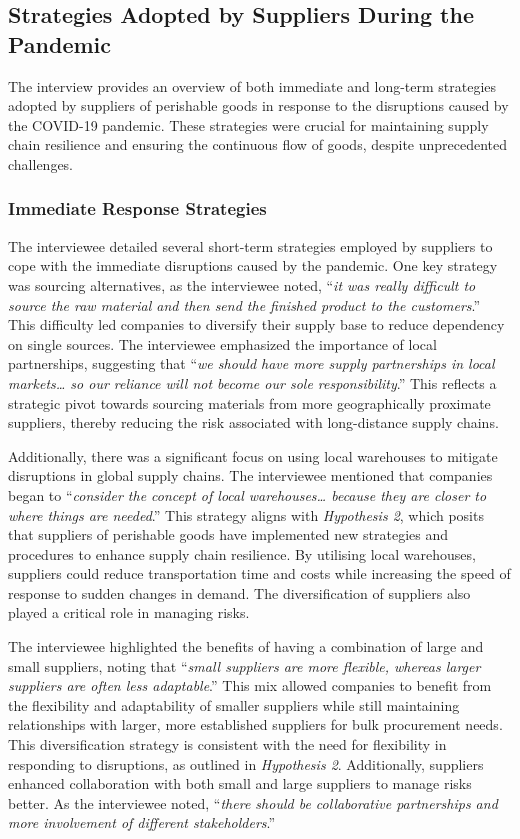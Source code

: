 
\subsection{Strategies Adopted by Suppliers During the Pandemic}

The interview provides an overview of both immediate and long-term strategies adopted by suppliers of perishable goods in response to the disruptions caused by the COVID-19 pandemic. These strategies were crucial for maintaining supply chain resilience and ensuring the continuous flow of goods, despite unprecedented challenges.

\subsubsection{Immediate Response Strategies}

The interviewee detailed several short-term strategies employed by suppliers to cope with the immediate disruptions caused by the pandemic. One key strategy was sourcing alternatives, as the interviewee noted, “\textit{it was really difficult to source the raw material and then send the finished product to the customers}.” This difficulty led companies to diversify their supply base to reduce dependency on single sources. The interviewee emphasized the importance of local partnerships, suggesting that “\textit{we should have more supply partnerships in local markets… so our reliance will not become our sole responsibility}.” This reflects a strategic pivot towards sourcing materials from more geographically proximate suppliers, thereby reducing the risk associated with long-distance supply chains.

Additionally, there was a significant focus on using local warehouses to mitigate disruptions in global supply chains. The interviewee mentioned that companies began to “\textit{consider the concept of local warehouses… because they are closer to where things are needed}.” This strategy aligns with \textit{Hypothesis 2}, which posits that suppliers of perishable goods have implemented new strategies and procedures to enhance supply chain resilience. By utilising local warehouses, suppliers could reduce transportation time and costs while increasing the speed of response to sudden changes in demand. The diversification of suppliers also played a critical role in managing risks. 

The interviewee highlighted the benefits of having a combination of large and small suppliers, noting that “\textit{small suppliers are more flexible, whereas larger suppliers are often less adaptable}.” This mix allowed companies to benefit from the flexibility and adaptability of smaller suppliers while still maintaining relationships with larger, more established suppliers for bulk procurement needs. This diversification strategy is consistent with the need for flexibility in responding to disruptions, as outlined in \textit{Hypothesis 2}. Additionally, suppliers enhanced collaboration with both small and large suppliers to manage risks better. As the interviewee noted, “\textit{there should be collaborative partnerships and more involvement of different stakeholders}.” 

